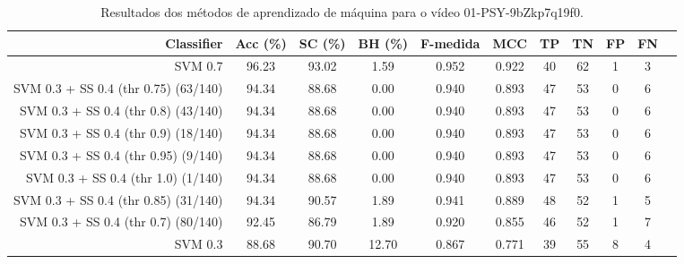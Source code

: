 \begin{table}[!htb]
\centering
\caption{Resultados dos métodos de aprendizado de máquina para o vídeo 01-PSY-9bZkp7q19f0.}
\label{tab:01-PSY-9bZkp7q19f0}
\begin{tabular}{r|c|c|c|c|c|c|c|c|c|c}
\hline\hline
Classifier & Acc (\%) & SC (\%) & BH (\%) & F-medida & MCC & TP & TN & FP & FN \\ \hline
SVM 0.7 & 96.23 & 93.02 & 1.59 & 0.952 & 0.922 & 40 & 62 & 1 & 3 \\ 
SVM 0.3 + SS 0.4 (thr 0.75) (63/140) & 94.34 & 88.68 & 0.00 & 0.940 & 0.893 & 47 & 53 & 0 & 6 \\ 
SVM 0.3 + SS 0.4 (thr 0.8) (43/140) & 94.34 & 88.68 & 0.00 & 0.940 & 0.893 & 47 & 53 & 0 & 6 \\ 
SVM 0.3 + SS 0.4 (thr 0.9) (18/140) & 94.34 & 88.68 & 0.00 & 0.940 & 0.893 & 47 & 53 & 0 & 6 \\ 
SVM 0.3 + SS 0.4 (thr 0.95) (9/140) & 94.34 & 88.68 & 0.00 & 0.940 & 0.893 & 47 & 53 & 0 & 6 \\ 
SVM 0.3 + SS 0.4 (thr 1.0) (1/140) & 94.34 & 88.68 & 0.00 & 0.940 & 0.893 & 47 & 53 & 0 & 6 \\ 
SVM 0.3 + SS 0.4 (thr 0.85) (31/140) & 94.34 & 90.57 & 1.89 & 0.941 & 0.889 & 48 & 52 & 1 & 5 \\ 
SVM 0.3 + SS 0.4 (thr 0.7) (80/140) & 92.45 & 86.79 & 1.89 & 0.920 & 0.855 & 46 & 52 & 1 & 7 \\ 
SVM 0.3 & 88.68 & 90.70 & 12.70 & 0.867 & 0.771 & 39 & 55 & 8 & 4 \\ 
\hline\hline
\end{tabular}
\end{table}
